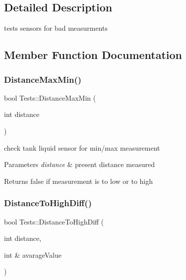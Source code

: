 \subsection{Detailed Description}
tests sensors for bad measurments 

\subsection{Member Function Documentation}
\mbox{\label{class_tests_ab1ed07135604b11e2811f3532ec75727}} 
\subsubsection{\texorpdfstring{Distance\+Max\+Min()}{DistanceMaxMin()}}
{\footnotesize\ttfamily bool Tests\+::\+Distance\+Max\+Min (\begin{DoxyParamCaption}\item[{int}]{distance }\end{DoxyParamCaption})}



check tank liquid sensor for min/max measurement 


\begin{DoxyParams}{Parameters}
{\em distance} & present distance measured \\
\hline
\end{DoxyParams}
\begin{DoxyReturn}{Returns}
false if measurement is to low or to high 
\end{DoxyReturn}
\mbox{\label{class_tests_aeb41ab6579c191e60fd53d4d78ffd989}} 
\subsubsection{\texorpdfstring{Distance\+To\+High\+Diff()}{DistanceToHighDiff()}}
{\footnotesize\ttfamily bool Tests\+::\+Distance\+To\+High\+Diff (\begin{DoxyParamCaption}\item[{int}]{distance,  }\item[{int \&}]{avarage\+Value }\end{DoxyParamCaption})}



